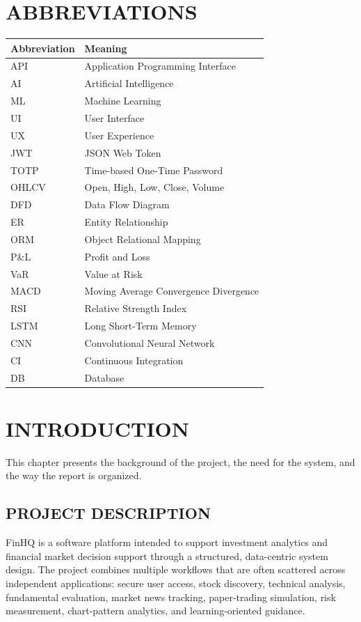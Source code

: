 \documentclass[12pt,a4paper]{report}
\newcommand{\projectshort}{FinHQ}
\begin{document}
\chapter*{ABBREVIATIONS}
\begin{longtable}{p{1.8in} p{4.5in}}
\textbf{Abbreviation} & \textbf{Meaning} \\
\hline
API & Application Programming Interface \\
AI & Artificial Intelligence \\
ML & Machine Learning \\
UI & User Interface \\
UX & User Experience \\
JWT & JSON Web Token \\
TOTP & Time-based One-Time Password \\
OHLCV & Open, High, Low, Close, Volume \\
DFD & Data Flow Diagram \\
ER & Entity Relationship \\
ORM & Object Relational Mapping \\
P\&L & Profit and Loss \\
VaR & Value at Risk \\
MACD & Moving Average Convergence Divergence \\
RSI & Relative Strength Index \\
LSTM & Long Short-Term Memory \\
CNN & Convolutional Neural Network \\
CI & Continuous Integration \\
DB & Database \\
\end{longtable}
\clearpage

\setcounter{page}{1}
\pagestyle{reportstyle}

\chapter{INTRODUCTION}
This chapter presents the background of the project, the need for the system, and the way the report is organized.

\section{PROJECT DESCRIPTION}
\projectshort{} is a software platform intended to support investment analytics and financial market decision support through a structured, data-centric system design. The project combines multiple workflows that are often scattered across independent applications: secure user access, stock discovery, technical analysis, fundamental evaluation, market news tracking, paper-trading simulation, risk measurement, chart-pattern analytics, and learning-oriented guidance.
\end{document}
